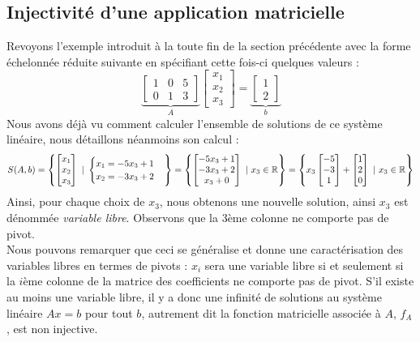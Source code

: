 \subsection{Injectivité d'une application matricielle}
\noindent Revoyons l'exemple introduit à la toute fin de la section précédente avec la forme échelonnée réduite suivante en spécifiant cette fois-ci quelques valeurs :
$$\underbrace{\begin{bmatrix}
1 & 0 & 5 \\
0 & 1 & 3
\end{bmatrix}}_{A} \begin{bmatrix}
x_1 \\ x_2 \\ x_3
\end{bmatrix} = \underbrace{\begin{bmatrix}
1 \\ 2
\end{bmatrix}}_{b}
$$ 
Nous avons déjà vu comment calculer l'ensemble de solutions de ce système linéaire, nous détaillons néanmoins son calcul :
$$S(A,b) = \left\{\begin{bmatrix}
x_1 \\ x_2 \\ x_3
\end{bmatrix} \ | \ \begin{cases} 
x_1 = -5x_3 + 1 \\
x_2 = -3x_3 + 2
\end{cases} \right\} = \left\{\begin{bmatrix}
-5x_3 + 1 \\ -3x_3 + 2 \\ x_3 + 0
\end{bmatrix} \ | \ x_3 \in \mathbb{R} \right\} = \left\{x_3\begin{bmatrix}
-5 \\ -3 \\ 1
\end{bmatrix} + \begin{bmatrix}
1 \\ 2 \\ 0
\end{bmatrix} \ | \ x_3 \in \mathbb{R} \right\}
$$
Ainsi, pour chaque choix de $x_3$, nous obtenons une nouvelle solution, ainsi $x_3$ est dénommée \textit{variable libre}. Observons que la $3$ème colonne ne comporte pas de pivot.\\

\noindent Nous pouvons remarquer que ceci se généralise et donne une caractérisation des variables libres en termes de pivots : $x_i$ sera une variable libre si et seulement si la $i$ème colonne de la matrice des coefficients ne comporte pas de pivot. S'il existe au moins une variable libre, il y a donc une infinité de solutions au système linéaire $Ax = b$ pour tout $b$, autrement dit la fonction matricielle associée à $A$, $f_A$, est non injective.\\

